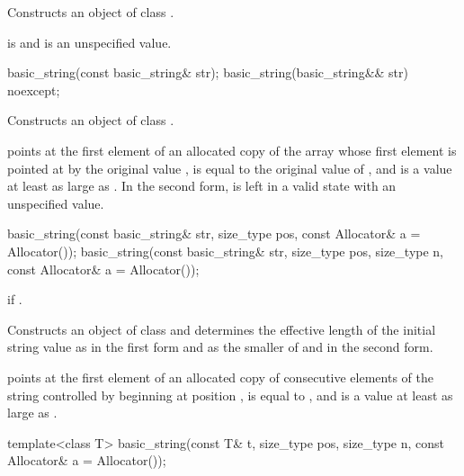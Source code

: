 \begin{itemdescr}
\pnum
\effects
Constructs an object of class .

\pnum
\ensures
{} is  and  is an unspecified value.
\end{itemdescr}

%
\begin{itemdecl}
basic_string(const basic_string& str);
basic_string(basic_string&& str) noexcept;
\end{itemdecl}

\begin{itemdescr}
\pnum
\effects
Constructs an object of class .

\pnum
\ensures
{} points at the first element of an allocated copy
of the array whose first element is pointed at by the original
value ,  is equal to the
original value of , and  is a value
at least as large as .
In the second form,  is left in a valid state with an unspecified value.
\end{itemdescr}

%
\begin{itemdecl}
basic_string(const basic_string& str, size_type pos,
             const Allocator& a = Allocator());
basic_string(const basic_string& str, size_type pos, size_type n,
             const Allocator& a = Allocator());
\end{itemdecl}

\begin{itemdescr}
\pnum
\throws
{}
if
.

\pnum
\effects
Constructs an object of class
and determines the effective length  of the initial string
value as  in the first form and
as the smaller of  and  in the second form.

\pnum
\ensures
{} points at the first element of an allocated copy of 
consecutive elements of the string controlled by  beginning at position
,  is equal to , and  is a
value at least as large as .
\end{itemdescr}

%
\begin{itemdecl}
template<class T>
  basic_string(const T& t, size_type pos, size_type n, const Allocator& a = Allocator());
\end{itemdecl}


